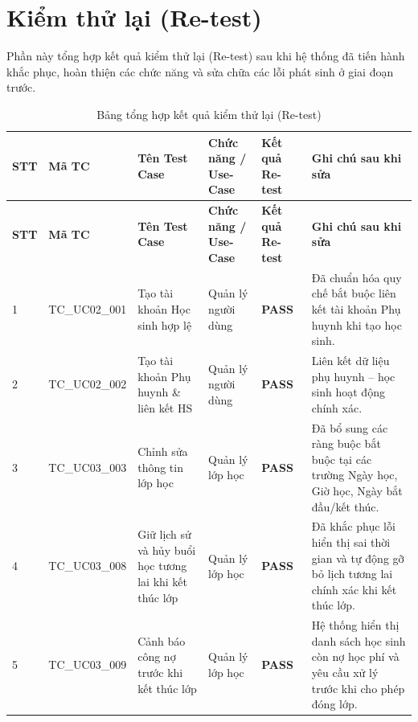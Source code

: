 \section{Kiểm thử lại (Re-test)}
Phần này tổng hợp kết quả kiểm thử lại (Re-test) sau khi hệ thống đã tiến hành khắc phục, hoàn thiện các chức năng và sửa chữa các lỗi phát sinh ở giai đoạn trước.

\vspace{0.4em}
\begin{longtable}{|>{\centering\arraybackslash}p{0.6cm}|>{\centering\arraybackslash}p{2.5cm}|>{\raggedright\arraybackslash}p{3.6cm}|>{\raggedright\arraybackslash}p{2.5cm}|>{\centering\arraybackslash}p{1.4cm}|>{\raggedright\arraybackslash}p{3.8cm}|}
\caption{Bảng tổng hợp kết quả kiểm thử lại (Re-test)}\label{tab:retest}\\
\hline
\textbf{STT} & \textbf{Mã TC} & \textbf{Tên Test Case} & \textbf{Chức năng / Use-Case} & \textbf{Kết quả Re-test} & \textbf{Ghi chú sau khi sửa} \\ \hline
\endfirsthead
\hline
\textbf{STT} & \textbf{Mã TC} & \textbf{Tên Test Case} & \textbf{Chức năng / Use-Case} & \textbf{Kết quả Re-test} & \textbf{Ghi chú sau khi sửa} \\ \hline
\endhead

\hline
\endfoot

1 & TC\_UC02\_001 & Tạo tài khoản Học sinh hợp lệ & Quản lý người dùng & \textbf{PASS} & Đã chuẩn hóa quy chế bắt buộc liên kết tài khoản Phụ huynh khi tạo học sinh. \\ \hline

2 & TC\_UC02\_002 & Tạo tài khoản Phụ huynh \& liên kết HS & Quản lý người dùng & \textbf{PASS} & Liên kết dữ liệu phụ huynh -- học sinh hoạt động chính xác. \\ \hline

3 & TC\_UC03\_003 & Chỉnh sửa thông tin lớp học & Quản lý lớp học & \textbf{PASS} & Đã bổ sung các ràng buộc bắt buộc tại các trường Ngày học, Giờ học, Ngày bắt đầu/kết thúc. \\ \hline

4 & TC\_UC03\_008 & Giữ lịch sử và hủy buổi học tương lai khi kết thúc lớp & Quản lý lớp học & \textbf{PASS} & Đã khắc phục lỗi hiển thị sai thời gian và tự động gỡ bỏ lịch tương lai chính xác khi kết thúc lớp. \\ \hline

5 & TC\_UC03\_009 & Cảnh báo công nợ trước khi kết thúc lớp & Quản lý lớp học & \textbf{PASS} & Hệ thống hiển thị danh sách học sinh còn nợ học phí và yêu cầu xử lý trước khi cho phép đóng lớp. \\ \hline


\end{longtable}
